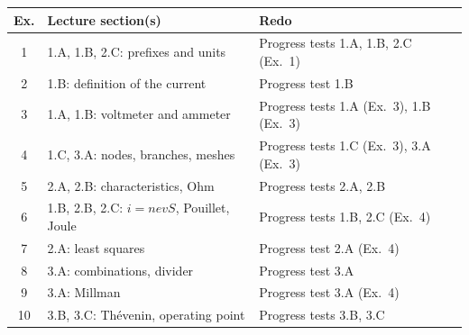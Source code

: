 \documentclass{ibetest}
\begin{document}
\finish

\ifkey
\par\vspace{4mm}
\begin{tcolorbox}[enhanced, colback=white, colframe=black!60, boxrule=0.5pt, arc=1mm,
  title={\sffamily\bfseries Diagnosis: where did you lose marks?}, fonttitle=\small,
  coltitle=black, colbacktitle=black!10, fontupper=\small]
\begin{tabular}{@{}c l l@{}}
\textbf{Ex.} & \textbf{Lecture section(s)} & \textbf{Redo} \\ \hline
1  & 1.A, 1.B, 2.C: prefixes and units   & Progress tests 1.A, 1.B, 2.C (Ex.~1)\\
2  & 1.B: definition of the current     & Progress test 1.B\\
3  & 1.A, 1.B: voltmeter and ammeter    & Progress tests 1.A (Ex.~3), 1.B (Ex.~3)\\
4  & 1.C, 3.A: nodes, branches, meshes  & Progress tests 1.C (Ex.~3), 3.A (Ex.~3)\\
5  & 2.A, 2.B: characteristics, Ohm     & Progress tests 2.A, 2.B\\
6  & 1.B, 2.B, 2.C: $i = nevS$, Pouillet, Joule & Progress tests 1.B, 2.C (Ex.~4)\\
7  & 2.A: least squares                 & Progress test 2.A (Ex.~4)\\
8  & 3.A: combinations, divider         & Progress test 3.A\\
9  & 3.A: Millman                       & Progress test 3.A (Ex.~4)\\
10 & 3.B, 3.C: Thévenin, operating point & Progress tests 3.B, 3.C
\end{tabular}
\end{tcolorbox}
\fi
\end{document}
